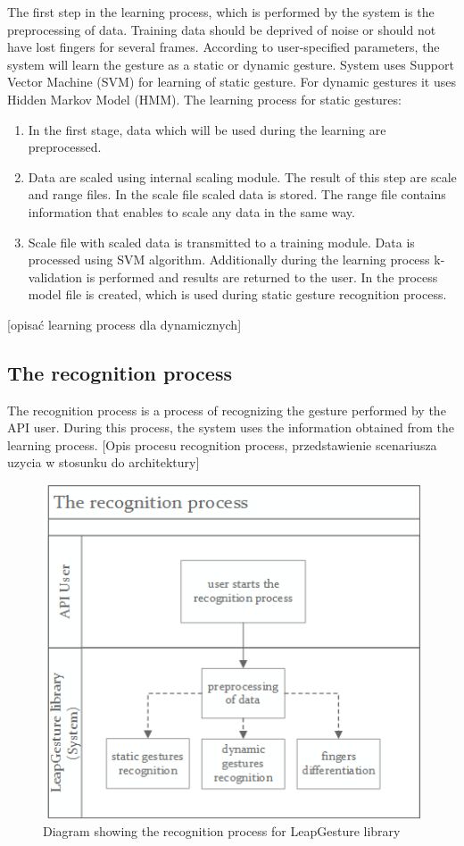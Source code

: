 The first step in the learning process, which is performed by the system is the preprocessing of data. Training data should be deprived of noise or should not have lost fingers for several frames. According to user-specified parameters, the system will learn the gesture as a static or dynamic gesture.
System uses Support Vector Machine (SVM) for learning of static gesture. For dynamic gestures it uses Hidden Markov Model (HMM). 
The learning process for static gestures:
\begin{enumerate}
\item In the first stage, data which will be used during the learning are preprocessed.
\item Data are scaled using internal scaling module. The result of this step are scale and range files. In the scale file scaled data is stored. The range file contains information that enables to scale any data in the same way.
\item Scale file with scaled data is transmitted to a training module. Data is processed using SVM algorithm. Additionally during the learning process k-validation is performed and results are returned to the user. In the process model file is created, which is used during static gesture recognition process.
\end{enumerate}
{\color{red}[opisać learning process dla dynamicznych]}


\subsection{The recognition process}
The recognition process is a process of recognizing the gesture performed by the API user. During this process, the system uses the information obtained from the learning process. {\color{red}[Opis procesu recognition process, przedstawienie scenariusza uzycia w stosunku do architektury]}

\begin{figure}[htb]
\centering
 \includegraphics[width=0.6\columnwidth]{figures/recognitionProcess.png}
 \caption{Diagram showing the recognition process for LeapGesture library}
 \label{recognitionprocess}
\end{figure}

